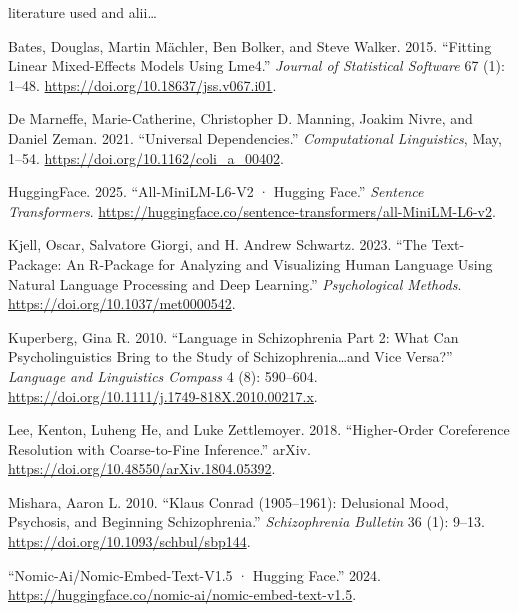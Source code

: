\documentclass[12pt,a4paper]{article}
\begin{document}
literature used and alii\ldots{}

\label{refs}
\begin{CSLReferences}{1}{0}
Bates, Douglas, Martin Mächler, Ben Bolker, and Steve Walker. 2015. {``Fitting {Linear} {Mixed}-{Effects} {Models} {Using} Lme4.''} \emph{Journal of Statistical Software} 67 (1): 1--48. \url{https://doi.org/10.18637/jss.v067.i01}.

De Marneffe, Marie-Catherine, Christopher D. Manning, Joakim Nivre, and Daniel Zeman. 2021. {``Universal {Dependencies}.''} \emph{Computational Linguistics}, May, 1--54. \url{https://doi.org/10.1162/coli_a_00402}.

HuggingFace. 2025. {``All-{MiniLM}-{L6}-V2 · {Hugging} {Face}.''} \emph{Sentence Transformers}. \url{https://huggingface.co/sentence-transformers/all-MiniLM-L6-v2}.

Kjell, Oscar, Salvatore Giorgi, and H. Andrew Schwartz. 2023. {``The Text-Package: {An} {R}-Package for {Analyzing} and {Visualizing} {Human} {Language} {Using} {Natural} {Language} {Processing} and {Deep} {Learning}.''} \emph{Psychological Methods}. \url{https://doi.org/10.1037/met0000542}.

Kuperberg, Gina R. 2010. {``Language in Schizophrenia {Part} 2: {What} Can Psycholinguistics Bring to the Study of Schizophrenia\ldots and Vice Versa?''} \emph{Language and Linguistics Compass} 4 (8): 590--604. \url{https://doi.org/10.1111/j.1749-818X.2010.00217.x}.

Lee, Kenton, Luheng He, and Luke Zettlemoyer. 2018. {``Higher-Order {Coreference} {Resolution} with {Coarse}-to-Fine {Inference}.''} arXiv. \url{https://doi.org/10.48550/arXiv.1804.05392}.

Mishara, Aaron L. 2010. {``Klaus {Conrad} (1905--1961): {Delusional} {Mood}, {Psychosis}, and {Beginning} {Schizophrenia}.''} \emph{Schizophrenia Bulletin} 36 (1): 9--13. \url{https://doi.org/10.1093/schbul/sbp144}.

{``Nomic-Ai/Nomic-Embed-Text-V1.5 · {Hugging} {Face}.''} 2024. \url{https://huggingface.co/nomic-ai/nomic-embed-text-v1.5}.


\end{CSLReferences}
\end{document}
